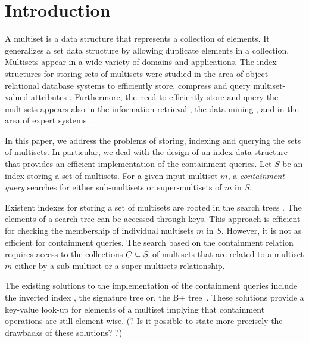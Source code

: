 \section{Introduction} \label{c:introduction}
%
%
A multiset is a data structure that represents a collection of elements. It generalizes a set data structure by allowing duplicate elements in a collection. Multisets appear in a wide variety of domains and applications. The index structures for storing sets of multisets were studied in the area of object-relational database systems to efficiently store, compress and query multiset-valued attributes \cite{bouros2016set,gripon2012compressing,ross2004symmetric,steinruecken2015compressing}. Furthermore, the need to efficiently store and query the multisets appears also in the information retrieval \cite{manning2008introduction,baeza1999modern}, the data mining \cite{interestingSets}, and in the area of expert systems \cite{reteAlgorithm,inbook}. 
%

In this paper, we address the problems of storing, indexing and querying the sets of multisets. In particular, we deal with the design of an index data structure that provides an efficient implementation of the containment queries. Let $S$ be an index storing a set of multisets. For a given input multiset $m$, a \emph{containment query} searches for either sub-multisets or super-multisets of $m$ in $S$. 

Existent indexes for storing a set of multisets are rooted in the search trees \cite{rivestBook}. The elements of a search tree can be accessed through keys. This approach is efficient for checking the membership of individual multisets $m$ in $S$. However, it is not as efficient for  containment queries. The search based on the containment relation requires access to the collections $C\subseteq\/S$ of multisets that are related to a multiset $m$ either by a sub-multiset or a super-multisets relationship. 

The existing solutions to the implementation of the containment queries include the inverted index \cite{zobel1992efficient,zobel1998inverted,broder2006indexing}, the signature tree \cite{tousidou2002sigstruc,yangjun2005stree,zobel1998inverted} or, the B+ tree~\cite{Helmer2003}. These solutions provide a key-value look-up for elements of a multiset implying that containment operations are still element-wise. (? Is it possible to state more precisely the drawbacks of these solutions? ?) 

